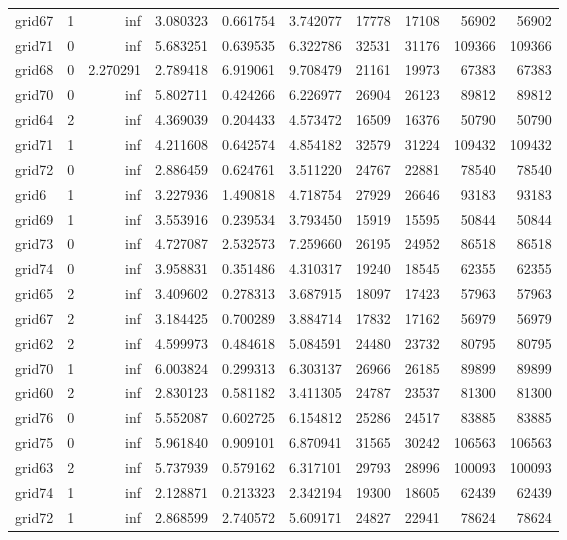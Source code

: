 \begin{longtable}{|l|r|r|r|r|r|r|r|r|r|}
grid67 & 1 & inf & 3.080323 & 0.661754 & 3.742077 & 17778 & 17108 & 56902 & 56902 \\
grid71 & 0 & inf & 5.683251 & 0.639535 & 6.322786 & 32531 & 31176 & 109366 & 109366 \\
grid68 & 0 & 2.270291 & 2.789418 & 6.919061 & 9.708479 & 21161 & 19973 & 67383 & 67383 \\
grid70 & 0 & inf & 5.802711 & 0.424266 & 6.226977 & 26904 & 26123 & 89812 & 89812 \\
grid64 & 2 & inf & 4.369039 & 0.204433 & 4.573472 & 16509 & 16376 & 50790 & 50790 \\
grid71 & 1 & inf & 4.211608 & 0.642574 & 4.854182 & 32579 & 31224 & 109432 & 109432 \\
grid72 & 0 & inf & 2.886459 & 0.624761 & 3.511220 & 24767 & 22881 & 78540 & 78540 \\
grid6 & 1 & inf & 3.227936 & 1.490818 & 4.718754 & 27929 & 26646 & 93183 & 93183 \\
grid69 & 1 & inf & 3.553916 & 0.239534 & 3.793450 & 15919 & 15595 & 50844 & 50844 \\
grid73 & 0 & inf & 4.727087 & 2.532573 & 7.259660 & 26195 & 24952 & 86518 & 86518 \\
grid74 & 0 & inf & 3.958831 & 0.351486 & 4.310317 & 19240 & 18545 & 62355 & 62355 \\
grid65 & 2 & inf & 3.409602 & 0.278313 & 3.687915 & 18097 & 17423 & 57963 & 57963 \\
grid67 & 2 & inf & 3.184425 & 0.700289 & 3.884714 & 17832 & 17162 & 56979 & 56979 \\
grid62 & 2 & inf & 4.599973 & 0.484618 & 5.084591 & 24480 & 23732 & 80795 & 80795 \\
grid70 & 1 & inf & 6.003824 & 0.299313 & 6.303137 & 26966 & 26185 & 89899 & 89899 \\
grid60 & 2 & inf & 2.830123 & 0.581182 & 3.411305 & 24787 & 23537 & 81300 & 81300 \\
grid76 & 0 & inf & 5.552087 & 0.602725 & 6.154812 & 25286 & 24517 & 83885 & 83885 \\
grid75 & 0 & inf & 5.961840 & 0.909101 & 6.870941 & 31565 & 30242 & 106563 & 106563 \\
grid63 & 2 & inf & 5.737939 & 0.579162 & 6.317101 & 29793 & 28996 & 100093 & 100093 \\
grid74 & 1 & inf & 2.128871 & 0.213323 & 2.342194 & 19300 & 18605 & 62439 & 62439 \\
grid72 & 1 & inf & 2.868599 & 2.740572 & 5.609171 & 24827 & 22941 & 78624 & 78624 \\

\end{longtable}
